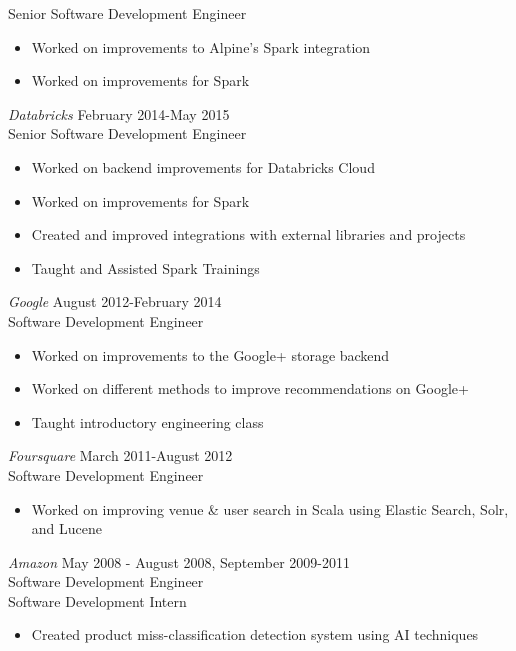 \documentclass[10pt,line,margin=0.1]{newsres}
\begin{document}
\begin{resume}
        Senior Software Development Engineer
        \begin{itemize}  \itemsep -2pt %
          \item Worked on improvements to Alpine's Spark integration
          \item Worked on improvements for Spark
        \end{itemize}
      {\sl Databricks} \hfill February 2014-May 2015\\
        Senior Software Development Engineer
        \begin{itemize}  \itemsep -2pt %
          \item Worked on backend improvements for Databricks Cloud
          \item Worked on improvements for Spark
          \item Created and improved integrations with external libraries and projects
          \item Taught and Assisted Spark Trainings
        \end{itemize}
        {\sl Google} \hfill August 2012-February 2014\\
        Software Development Engineer
        \begin{itemize}  \itemsep -2pt %
          \item Worked on improvements to the Google+ storage backend
          \item Worked on different methods to improve recommendations on Google+
          \item Taught introductory engineering class
        \end{itemize}
        {\sl Foursquare} \hfill March 2011-August 2012\\
        Software Development Engineer
        \begin{itemize}  \itemsep -2pt %
        \item Worked on improving venue \& user search in Scala using Elastic Search, Solr, and Lucene
        \end{itemize}
        {\sl Amazon} \hfill            May 2008 - August 2008, September 2009-2011 \\
        Software Development Engineer \\
        Software Development Intern
        \begin{itemize}  \itemsep -2pt %
        \item Created product miss-classification detection system using AI techniques

\end{itemize}
\end{resume}
\end{document}
